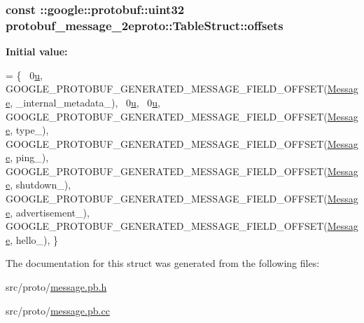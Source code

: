 \subsubsection[{\texorpdfstring{offsets}{offsets}}]{\setlength{\rightskip}{0pt plus 5cm}const \+::google\+::protobuf\+::uint32 protobuf\+\_\+message\+\_\+2eproto\+::\+Table\+Struct\+::offsets\hspace{0.3cm}{\ttfamily [static]}}\hypertarget{structprotobuf__message__2eproto_1_1_table_struct_a231499f7ef7234621ad122488be7e3ea}{}\label{structprotobuf__message__2eproto_1_1_table_struct_a231499f7ef7234621ad122488be7e3ea}
{\bfseries Initial value\+:}
\begin{DoxyCode}
= \{
  ~0\hyperlink{pem_8h_aae315ef0aa014d60426f50686217d264}{u},  
  GOOGLE\_PROTOBUF\_GENERATED\_MESSAGE\_FIELD\_OFFSET(\hyperlink{class_message}{Message}, \_internal\_metadata\_),
  ~0\hyperlink{pem_8h_aae315ef0aa014d60426f50686217d264}{u},  
  ~0\hyperlink{pem_8h_aae315ef0aa014d60426f50686217d264}{u},  
  GOOGLE\_PROTOBUF\_GENERATED\_MESSAGE\_FIELD\_OFFSET(\hyperlink{class_message}{Message}, type\_),
  GOOGLE\_PROTOBUF\_GENERATED\_MESSAGE\_FIELD\_OFFSET(\hyperlink{class_message}{Message}, ping\_),
  GOOGLE\_PROTOBUF\_GENERATED\_MESSAGE\_FIELD\_OFFSET(\hyperlink{class_message}{Message}, shutdown\_),
  GOOGLE\_PROTOBUF\_GENERATED\_MESSAGE\_FIELD\_OFFSET(\hyperlink{class_message}{Message}, advertisement\_),
  GOOGLE\_PROTOBUF\_GENERATED\_MESSAGE\_FIELD\_OFFSET(\hyperlink{class_message}{Message}, hello\_),
\}
\end{DoxyCode}


The documentation for this struct was generated from the following files\+:\begin{DoxyCompactItemize}
\item 
src/proto/\hyperlink{message_8pb_8h}{message.\+pb.\+h}\item 
src/proto/\hyperlink{message_8pb_8cc}{message.\+pb.\+cc}\end{DoxyCompactItemize}
